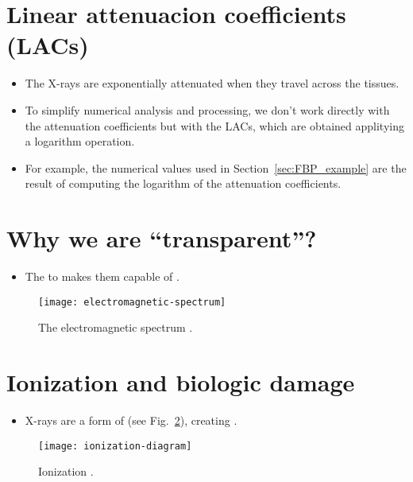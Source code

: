 \section{Linear attenuacion coefficients (LACs)}
\begin{itemize}
\item The X-rays are
  exponentially attenuated when they travel across the tissues.
\item To simplify numerical analysis and processing, we don't work
  directly with the attenuation coefficients but with the LACs, which
  are obtained applitying a logarithm operation.
\item For example, the numerical values used in
  Section~\ref{sec:FBP_example} are the result of computing the
  logarithm of the 
  attenuation coefficients.
\end{itemize}

\section{Why we are ``transparent''?}
\begin{itemize}
\item The  to  makes them capable of .
\end{itemize}
\vspace{-4ex}
\begin{figure}[!h]
  \centering
  \texttt{[image: electromagnetic-spectrum]}
  \caption{The electromagnetic spectrum
    \cite{X-rays_in_spectrum}.\label{fig:X-rays_in_spectrum}}
\end{figure}

\section{Ionization and biologic damage}
\begin{itemize}
\item X-rays are a form of  (see Fig.~\ref{fig:ionization}), creating
  .
\end{itemize}
\vspace{-3ex}
\begin{figure}[!h]
  \centering
  \texttt{[image: ionization-diagram]}
  \caption{Ionization
    \cite{Perakende_ionization}.\label{fig:ionization}}
\end{figure}

